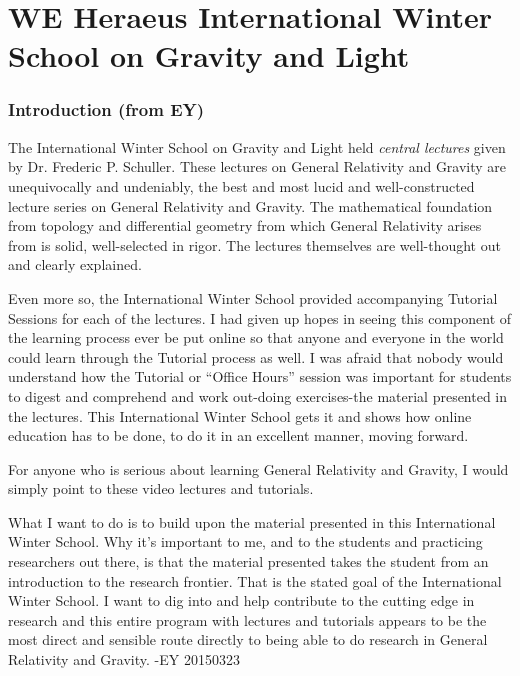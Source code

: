 \part{WE Heraeus International Winter School on Gravity and Light}


\section*{Introduction (from EY)}

The International Winter School on Gravity and Light held \emph{central lectures} given by Dr. Frederic P. Schuller. These lectures on General Relativity and Gravity are unequivocally and undeniably, the best and most lucid and well-constructed lecture series on General Relativity and Gravity.  The mathematical foundation from topology and differential geometry from which General Relativity arises from is solid, well-selected in rigor.  The lectures themselves are well-thought out and clearly explained.  

Even more so, the International Winter School provided accompanying Tutorial Sessions for each of the lectures.  I had given up hopes in seeing this component of the learning process ever be put online so that anyone and everyone in the world could learn through the Tutorial process as well.  I was afraid that nobody would understand how the Tutorial or ``Office Hours'' session was important for students to digest and comprehend and work out-doing exercises-the material presented in the lectures.  This International Winter School gets it and shows how online education has to be done, to do it in an excellent manner, moving forward.  

For anyone who is serious about learning General Relativity and Gravity, I would simply point to these video lectures and tutorials.  

What I want to do is to build upon the material presented in this International Winter School.  Why it's important to me, and to the students and practicing researchers out there, is that the material presented takes the student from an introduction to the research frontier.  That is the stated goal of the International Winter School.  I want to dig into and help contribute to the cutting edge in research and this entire program with lectures and tutorials appears to be the most direct and sensible route directly to being able to do research in General Relativity and Gravity. -EY 20150323

